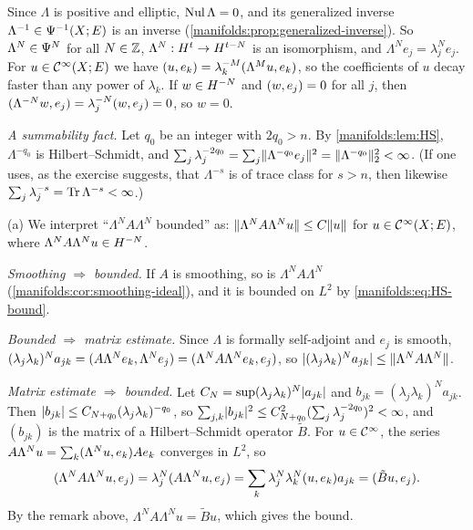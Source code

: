 \subsection*{}
Since $\Lambda$ is positive and elliptic, $\operatorname{Nul}\Lambda=0$, and its generalized inverse
$\Lambda^{-1}\in\Psi^{-1}(X;E)$ is an inverse (\cref{manifolds:prop:generalized-inverse}). So
$\Lambda^N\in\Psi^{N}$ for all $N\in\mathbb{Z}$, $\Lambda^N:H^{t}\to H^{t-N}$ is an isomorphism, and
$\Lambda^Ne_j=\lambda_j^Ne_j$. For $u\in\mathcal{C}^\infty(X;E)$ we have $( u, e_k)=\lambda_k^{-M}( \Lambda^Mu, e_k)$, so
the coefficients of $u$ decay faster than any power of $\lambda_k$. If $w\in H^{-N}$ and
$( w, e_j)=0$ for all $j$, then $( \Lambda^{-N}w, e_j)=\lambda_j^{-N}( w, e_j)=0$, so $w=0$.

\emph{A summability fact.} Let $q_0$ be an integer with $2q_0>n$. By \cref{manifolds:lem:HS},
$\Lambda^{-q_0}$ is Hilbert--Schmidt, and
$\sum_j\lambda_j^{-2q_0}=\sum_j\lVert \Lambda^{-q_0}e_j\rVert^2=\lVert \Lambda^{-q_0}\rVert_2^2<\infty$. (If one uses, as the
exercise suggests, that $\Lambda^{-s}$ is of trace class for $s>n$, then likewise
$\sum_j\lambda_j^{-s}=\operatorname{Tr}\Lambda^{-s}<\infty$.)

(a) We interpret ``$\Lambda^NA\Lambda^N$ bounded'' as: $\lVert \Lambda^NA\Lambda^Nu\rVert\le C\lVert u\rVert$ for
$u\in\mathcal{C}^\infty(X;E)$, where $\Lambda^NA\Lambda^Nu\in H^{-N}$.

\emph{Smoothing $\Rightarrow$ bounded.} If $A$ is smoothing, so is $\Lambda^NA\Lambda^N$
(\cref{manifolds:cor:smoothing-ideal}), and it is bounded on $L^2$ by \eqref{manifolds:eq:HS-bound}.

\emph{Bounded $\Rightarrow$ matrix estimate.} Since $\Lambda$ is formally self-adjoint and $e_j$ is
smooth,
$(\lambda_j\lambda_k)^Na_{jk}=( A\Lambda^Ne_k, \Lambda^Ne_j)=( \Lambda^NA\Lambda^Ne_k, e_j)$, so
$\lvert (\lambda_j\lambda_k)^Na_{jk}\rvert\le\lVert \Lambda^NA\Lambda^N\rVert$.

\emph{Matrix estimate $\Rightarrow$ bounded.} Let $C_N=\sup(\lambda_j\lambda_k)^N\lvert a_{jk}\rvert$ and
$b_{jk}=(\lambda_j\lambda_k)^Na_{jk}$. Then $\lvert b_{jk}\rvert\le C_{N+q_0}(\lambda_j\lambda_k)^{-q_0}$, so
$\sum_{j,k}\lvert b_{jk}\rvert^2\le C_{N+q_0}^2(\sum_j\lambda_j^{-2q_0})^2<\infty$, and $(b_{jk})$ is the matrix of a
Hilbert--Schmidt operator $\tilde B$. For $u\in\mathcal{C}^\infty$, the series
$A\Lambda^Nu=\sum_k( \Lambda^Nu, e_k)Ae_k$ converges in $L^2$, so
\begin{equation*}
( \Lambda^NA\Lambda^Nu, e_j)=\lambda_j^N( A\Lambda^Nu, e_j)=\sum_k\lambda_j^N\lambda_k^N( u, e_k)a_{jk}=( \tilde Bu, e_j).
\end{equation*}
By the remark above, $\Lambda^NA\Lambda^Nu=\tilde Bu$, which gives the bound.

